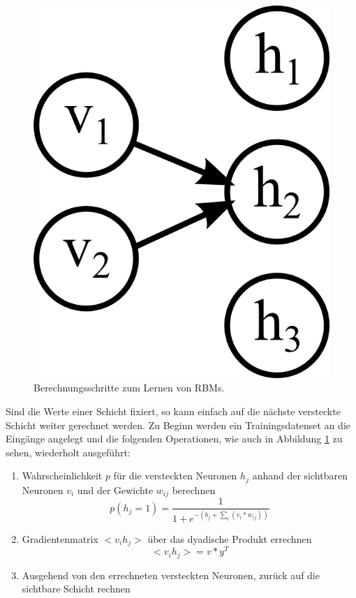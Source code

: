 \begin{figure}
{\begin{minipage}{0.33\textwidth}
	\includegraphics[scale=1]{images/rbm-step3.png}\end{minipage}}
\caption{Berechnungsschritte zum Lernen von RBMs.}
\label{fig:rbm-steps}
\end{figure}

Sind die Werte einer Schicht fixiert, so kann einfach auf die nächste versteckte Schicht weiter gerechnet werden. Zu Beginn werden ein Trainingsdatenset an die Eingänge angelegt und die folgenden Operationen, wie auch in Abbildung \ref{fig:rbm-steps} zu sehen, wiederholt ausgeführt:

\begin{enumerate}
\item Wahrscheinlichkeit $p$ für die versteckten Neuronen $h_j$ anhand der sichtbaren Neuronen $v_i$ und der Gewichte $w_{ij}$ berechnen $$p(h_j=1) = \frac{1}{1+e^{-(b_j+\sum_{i}(v_i*w_{ij}))}}$$
\item Gradientenmatrix $<v_ih_j>$ über das dyadische Produkt errechnen $$<v_ih_j> = v*y^T$$
\item Ausgehend von den errechneten versteckten Neuronen, zurück auf die sichtbare Schicht rechnen
\end{enumerate}

